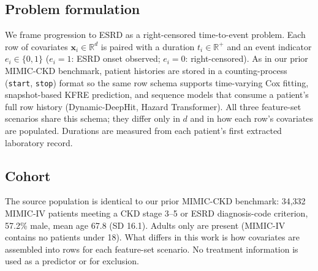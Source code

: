 \subsection{Problem formulation}
We frame progression to ESRD as a right-censored time-to-event problem. Each row of covariates $\boldsymbol{x}_i \in \mathbb{R}^d$ is paired with a duration $t_i \in \mathbb{R}^+$ and an event indicator $e_i \in \{0,1\}$ ($e_i=1$: ESRD onset observed; $e_i=0$: right-censored). As in our prior MIMIC-CKD benchmark, patient histories are stored in a counting-process (\texttt{start}, \texttt{stop}) format so the same row schema supports time-varying Cox fitting, snapshot-based KFRE prediction, and sequence models that consume a patient's full row history (Dynamic-DeepHit, Hazard Transformer). All three feature-set scenarios share this schema; they differ only in $d$ and in how each row's covariates are populated. Durations are measured from each patient's first extracted laboratory record.

\subsection{Cohort} \label{sec:cohort}
The source population is identical to our prior MIMIC-CKD benchmark: 34{,}332 MIMIC-IV patients meeting a CKD stage 3--5 or ESRD diagnosis-code criterion, 57.2\% male, mean age 67.8 (SD 16.1). Adults only are present (MIMIC-IV contains no patients under 18). What differs in this work is how covariates are assembled into rows for each feature-set scenario. No treatment information is used as a predictor or for exclusion.

